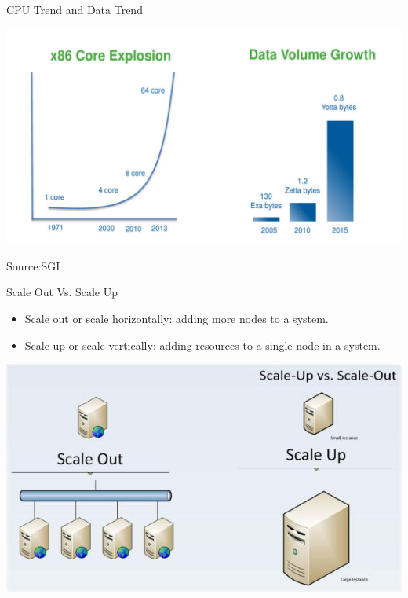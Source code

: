 \documentclass[english]{beamer} %
\begin{document}
\begin{frame}{CPU Trend and Data Trend}
\begin{center}
\includegraphics[scale=0.4]{fig/cpudata}
\end{center}
\tiny{Source:SGI}
\end{frame}

\begin{frame}{Scale Out Vs. Scale Up}
    \begin{itemize}
    \item Scale out or scale horizontally: adding more nodes to a system.
    \item Scale up or scale vertically: adding resources to a single node in a
    system.
    \end{itemize}
\begin{center}
\includegraphics[scale=0.5]{fig/scale}
\end{center}
\end{frame}
\end{document}
